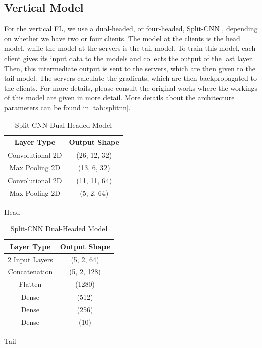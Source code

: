 \subsection{Vertical Model}

For the vertical FL, we use a dual-headed, or four-headed, Split-CNN \cite{10.1145/3297858.3304038, 10.48550/arxiv.2104.00489}, depending on whether we have two or four clients. The model at the clients is the head model, while the model at the servers is the tail model. To train this model, each client gives its input data to the models and collects the output of the last layer. Then, this intermediate output is sent to the servers, which are then given to the tail model. The servers calculate the gradients, which are then backpropagated to the clients. For more details, please consult the original works where the workings of this model are given in more detail. More details about the architecture parameters can be found in \autoref{tab:splitnn}.

\begin{table}[!h]
    \begin{subtable}[h]{0.49\textwidth}
        \centering
        \begin{tabular}{c|c}
            \hline \hline
            Layer Type       & Output Shape \\ \hline \hline
            Convolutional 2D & (26, 12, 32) \\ \hline
            Max Pooling 2D   & (13, 6, 32) \\ \hline
            Convolutional 2D & (11, 11, 64) \\ \hline
            Max Pooling 2D   & (5, 2, 64)   \\ \hline
        \end{tabular}
        \caption{Head}
    \end{subtable}
    \hfill
    \begin{subtable}[h]{0.49\textwidth}
        \centering
        \begin{tabular}{c|c}
            \hline\hline
            Layer Type     & Output Shape \\ \hline\hline
            2 Input Layers & (5, 2, 64)   \\ \hline
            Concatenation  & (5, 2, 128)  \\ \hline
            Flatten        & (1280)       \\ \hline
            Dense          & (512)        \\ \hline
            Dense          & (256)        \\ \hline
            Dense          & (10)         \\ \hline
        \end{tabular}
        \caption{Tail}
     \end{subtable}
     \caption{Split-CNN Dual-Headed Model}
     \label{tab:splitnn}
\end{table}

